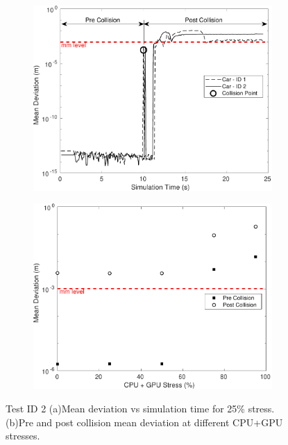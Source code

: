 \begin{figure}[h]
    \centering
    \begin{subfigure}{.49\textwidth}
        \includegraphics[width=1\textwidth]{Other/Figures/CarsCollisionCG25.pdf}
        \caption{}
        \label{CarsCollisionCG25}
    \end{subfigure}
    \begin{subfigure}{.49\textwidth}
        \includegraphics[width=1\textwidth]{Other/Figures/CarsCollisionPrePost.pdf}
        \caption{}
        \label{CarsCollisionPrePost}
    \end{subfigure}
    \caption{Test ID 2 (a)Mean deviation vs simulation time for 25\% stress. (b)Pre and post collision mean deviation at different CPU+GPU stresses.}
\end{figure}

